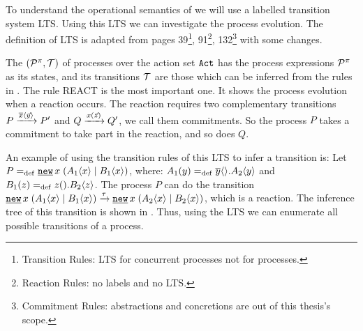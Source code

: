 To understand the operational semantics of \picalc{} we will use  a labelled transition system LTS. Using this LTS we can investigate the \picalc{} process evolution. The definition of LTS is adapted from \cite{milner} pages 39\footnote{Transition Rules: LTS for concurrent processes not for \picalc{} processes.}, 91\footnote{Reaction Rules: no labels and no LTS.}, 132\footnote{Commitment Rules: abstractions and concretions are out of this thesis's scope.} with some changes.

\begin{definition}
\label{def_pi_trans_system}
The  $(\procs,\traces)$ of \picalc{} processes over the action set $\mathtt{Act}$ has the process expressions $\mathcal P^{\pi}$ as its states, and its transitions $\traces$ are those which can be inferred from the rules in .
The rule REACT is the most important one. It shows the process evolution when a reaction occurs. The reaction requires two complementary transitions $P \xrightarrow{\overline{x}\langle\vec{y}\rangle} P'$ and $Q \xrightarrow{x(\vec{z})} Q'$, we call them commitments. So the process $P$ takes a commitment to take part in the reaction, and so does $Q$.

\end{definition}


An example of using the transition rules of this LTS to infer a transition is: Let $P\define\procres{x}{(\procpar{\proccall{A_1}{x}}{\proccall{B_1}{x}})}$, where: $A_1(y)=_{\mathrm{def}}{}\overline{y}\langle{}\rangle.A_2\langle y\rangle$ and $B_1(z)=_{\mathrm{def}}{}z({}).B_2\langle z\rangle$. The process $P$ can do the transition $\procres{x}{(\procpar{\proccall{A_1}{x}}{\proccall{B_1}{x}})} \transs{\tau} \procres{x}{(\procpar{\proccall{A_2}{x}}{\proccall{B_2}{x}})}$, which is a reaction. The inference tree of this transition is shown in . Thus, using the LTS we can enumerate all possible transitions of a \picalc{} process.



